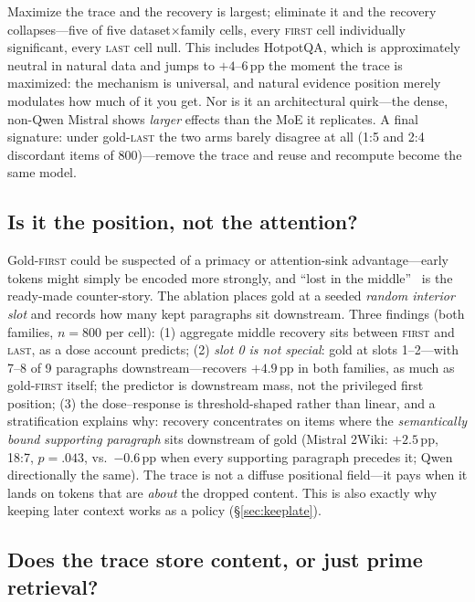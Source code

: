 \documentclass{article} %
\newcommand{\pp}{\,\mathrm{pp}}
\begin{document}
Maximize the trace and the recovery is largest; eliminate it and the recovery collapses---five of five dataset$\times$family cells, every \textsc{first} cell individually significant, every \textsc{last} cell null. This includes HotpotQA, which is approximately neutral in natural data and jumps to $+4$--$6\pp$ the moment the trace is maximized: the mechanism is universal, and natural evidence position merely modulates how much of it you get. Nor is it an architectural quirk---the dense, non-Qwen Mistral shows \emph{larger} effects than the MoE it replicates. A final signature: under gold-\textsc{last} the two arms barely disagree at all (1:5 and 2:4 discordant items of 800)---remove the trace and reuse and recompute become the same model.

\subsection{Is it the position, not the attention?}
\label{sec:middle}

Gold-\textsc{first} could be suspected of a primacy or attention-sink advantage---early tokens might simply be encoded more strongly, and ``lost in the middle''~\citep{litm} is the ready-made counter-story. The ablation places gold at a seeded \emph{random interior slot} and records how many kept paragraphs sit downstream. Three findings (both families, $n=800$ per cell):
(1) aggregate middle recovery sits between \textsc{first} and \textsc{last}, as a dose account predicts;
(2) \emph{slot 0 is not special}: gold at slots 1--2---with 7--8 of 9 paragraphs downstream---recovers $+4.9\pp$ in both families, as much as gold-\textsc{first} itself; the predictor is downstream mass, not the privileged first position;
(3) the dose--response is threshold-shaped rather than linear, and a stratification explains why: recovery concentrates on items where the \emph{semantically bound supporting paragraph} sits downstream of gold (Mistral 2Wiki: $+2.5\pp$, 18:7, $p{=}.043$, vs.\ $-0.6\pp$ when every supporting paragraph precedes it; Qwen directionally the same). The trace is not a diffuse positional field---it pays when it lands on tokens that are \emph{about} the dropped content. This is also exactly why keeping later context works as a policy (\S\ref{sec:keeplate}).

\subsection{Does the trace store content, or just prime retrieval?}
\label{sec:cf}
\end{document}
